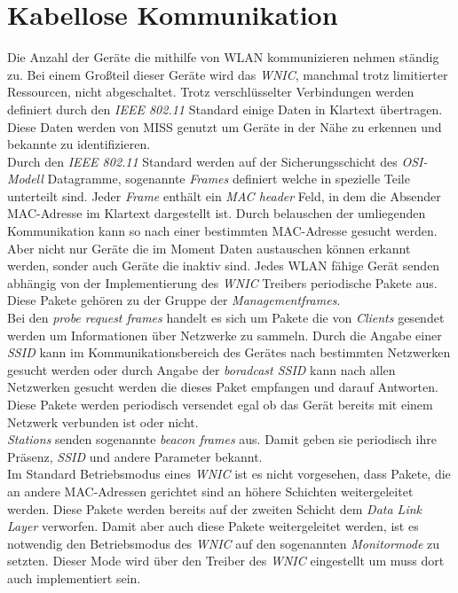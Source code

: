 \documentclass[]{report}
\begin{document}
\section{Kabellose Kommunikation}
Die Anzahl der Geräte die mithilfe von WLAN kommunizieren nehmen ständig zu. Bei einem Großteil dieser Geräte wird das \textit{WNIC}, manchmal trotz limitierter Ressourcen, nicht abgeschaltet. Trotz verschlüsselter Verbindungen werden definiert durch den \textit{IEEE 802.11} Standard einige Daten in Klartext übertragen. Diese Daten werden von MISS genutzt um Geräte in der Nähe zu erkennen und bekannte zu identifizieren. \\
Durch den \textit{IEEE 802.11} Standard werden auf der Sicherungsschicht des \textit{OSI-Modell} Datagramme, sogenannte \textit{Frames} definiert welche in spezielle Teile unterteilt sind. Jeder \textit{Frame} enthält ein \textit{MAC header} Feld, in dem die Absender MAC-Adresse im Klartext dargestellt ist. Durch belauschen der umliegenden Kommunikation kann so nach einer bestimmten MAC-Adresse gesucht werden. \\
Aber nicht nur Geräte die im Moment Daten austauschen können erkannt werden, sonder auch Geräte die inaktiv sind. Jedes WLAN fähige Gerät senden abhängig von der Implementierung des \textit{WNIC} Treibers periodische Pakete aus. Diese Pakete gehören zu der Gruppe der \textit{Managementframes}. \\
Bei den \textit{probe request frames} handelt es sich um Pakete die von \textit{Clients} gesendet werden um Informationen über Netzwerke zu sammeln. Durch die Angabe einer \textit{SSID} kann im Kommunikationsbereich des Gerätes nach bestimmten Netzwerken gesucht werden oder durch Angabe der \textit{boradcast SSID} kann nach allen Netzwerken gesucht werden die dieses Paket empfangen und darauf Antworten. Diese Pakete werden periodisch versendet egal ob das Gerät bereits mit einem Netzwerk verbunden ist oder nicht.\\
\textit{Stations} senden sogenannte \textit{beacon frames} aus. Damit geben sie periodisch ihre Präsenz, \textit{SSID} und andere Parameter bekannt. \\
Im Standard Betriebsmodus eines \textit{WNIC} ist es nicht vorgesehen, dass Pakete, die an andere MAC-Adressen gerichtet sind an höhere Schichten weitergeleitet werden. Diese Pakete werden bereits auf der zweiten Schicht dem \textit{Data Link Layer} verworfen. Damit aber auch diese Pakete weitergeleitet werden, ist es notwendig den Betriebsmodus des \textit{WNIC} auf den sogenannten \textit{Monitormode} zu setzten. Dieser Mode wird über den Treiber des \textit{WNIC} eingestellt um muss dort auch implementiert sein. 
\end{document}
